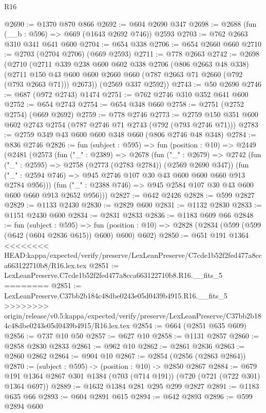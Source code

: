 \begin{lexlean}{R16}
\begin{coremodule}
{{{{{{{{{{{{{{{{{@2690 := @1370 @870 @866
@2692 := @604 @2690 @347
@2698 := @2688 (fun (__b : @596) => @669 (@1643 @2692 @746)) @2593
@2703 := @762 @2663 @310 @341 @641 @600
@2704 := @654 @338
@2706 := @654 @2660 @660
@2710 := @2703 (@2704 @2706) (@669 @2593)
@2711 := @778 @2663
@2742 := @2698
    (@2710
      (@2711
        @339
        @238
        @600
        @602
        @338
        @2706
        (@806 @2663 @48 @338)
        (@2711 @150 @43 @600 @600 @2660 @660 (@787 @2663 @71 @2660 (@792 (@793 @2663 @71))) @2673))
      (@2569 @337 @2592))
@2743 := @50 @2690
@2746 := @687 (@972 @2743) @1474
@2751 := @762 @2746 @310 @352 @641 @600
@2752 := @654 @2743
@2754 := @654 @348 @660
@2758 := @2751 (@2752 @2754) (@669 @2692)
@2759 := @778 @2746
@2773 := @2759 @150 @351 @600 @602 @2743 @2754 (@787 @2746 @71 @2743 (@792 (@793 @2746 @71)))
@2783 := @2759 @349 @43 @600 @600 @348 @660 (@806 @2746 @48 @348)
@2784 := @836 @2746
@2826 := fun (subject : @595) =>
  fun (position : @10) =>
  @2449
    (@2481
      (@2573
        (fun ("_" : @2389) =>
        @2678
          (fun ("_" : @2679) =>
          @2742
            (fun ("_" : @2595) => @2758 (@2773 (@2783 @2784)) (@2569 @2690 @347))
            (fun ("_" : @2594 @746) => @945 @2746 @107 @30 @43 @600 @600 @660 @913 @2784 @956)))
        (fun ("_" : @2388 @746) => @945 @2584 @107 @30 @43 @600 @600 @660 @913 @2652 @956)))
@2827 := @642 @2426
@2828 := @599 @2827
@2829 := @1133 @2430
@2830 := @2829 @600
@2831 := @1132 @2830
@2833 := @1151 @2430 @600
@2834 := @2831 @2833
@2836 := @1183 @609 @66
@2848 := fun (subject : @595) =>
  fun (position : @10) => @2828 (@2834 (@599 (@599 (@642 (@604 @2836 @615)) @600) @600) @602)
@2850 := @651 @191 @1364
<<<<<<<< HEAD:kappa/expected/verify/preserve/LexLeanPreserve/C7cde1b52f2fed477a8cca663122710b8/R16.lex.tex
@2851 := LexLeanPreserve.C7cde1b52f2fed477a8cca663122710b8.R16.__fits_5
========
@2851 := LexLeanPreserve.C37bb2b184c48dbe0243e05d0439b4915.R16.__fits_5
>>>>>>>> origin/release/v0.5:kappa/expected/verify/preserve/LexLeanPreserve/C37bb2b184c48dbe0243e05d0439b4915/R16.lex.tex
@2854 := @664 (@2851 @635 @609)
@2856 := @737 @10 @50
@2857 := @627 @10
@2858 := @1131 @2857
@2860 := @2858 @2830 @2833
@2861 := @962 @10
@2862 := @2861 @2836
@2863 := @2860 @2862
@2864 := @904 @10
@2867 := @2854 (@2856 (@2863 @2864))
@2870 := (subject : @595) -> (position : @10) -> @2850 @2867
@2884 := @679 @191 @1364 @2867 @301 @1384 (@703 (@714 @191)) (@720 (@721 (@722 @301) @1364 @697))
@2889 := @1632 @1384 @281 @295 @299 @2827
@2891 := @1183 @635 @66
@2893 := @604 @2891 @615
@2894 := @642 @2893
@2896 := @599 @2894 @600
}}}}}}}}}}}}}}}}}
\end{coremodule}
\end{lexlean}
